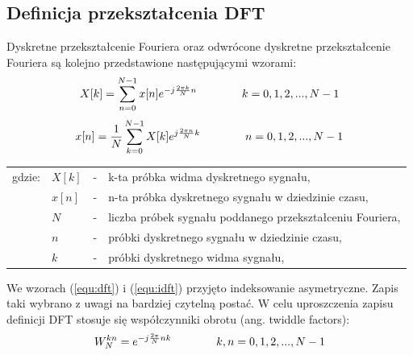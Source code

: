 \subsection{Definicja przekształcenia DFT}
Dyskretne przekształcenie Fouriera oraz odwrócone dyskretne przekształcenie Fouriera są kolejno przedstawione następującymi wzorami:
\begin{equation} \label{equ:dft}
\openup\jot
\begin{aligned}[t]
X[k] = \sum_{n=0}^{N-1} x[n]e^{-j\frac{2\pi k}{N}n} \\ 
\end{aligned}
\qquad\qquad %
\begin{aligned}[t]
k = 0, 1, 2, ..., N - 1 \\
\end{aligned}
\end{equation}
\begin{equation} \label{equ:idft}
\openup\jot
\begin{aligned}[t]
x[n] = \frac{1}{N}\sum_{k=0}^{N-1} X[k]e^{j\frac{2\pi n}{N}k}  \\  
\end{aligned}
\qquad\qquad %
\begin{aligned}[t]
 n = 0, 1, 2, ..., N - 1 \\
 \end{aligned}
\end{equation}
\begin{tabular}{ l l l l}
	gdzie: & $X[k]$ &  - & k-ta próbka widma dyskretnego sygnału, \\
	&	$x[n]$ & - &  n-ta próbka dyskretnego sygnału w dziedzinie czasu, \\
	&	$N$ & - &  liczba próbek sygnału poddanego przekształceniu Fouriera,\\
	&	$n$ & - &  próbki dyskretnego sygnału w dziedzinie czasu, \\
	&	$k$ & - &  próbki dyskretnego widma sygnału, \\
\end{tabular}

We wzorach (\ref{equ:dft}) i (\ref{equ:idft}) przyjęto indeksowanie asymetryczne. Zapis taki wybrano z uwagi na bardziej czytelną postać. W celu uproszczenia zapisu definicji DFT stosuje się współczynniki obrotu (ang. twiddle factors):
\begin{equation} \label{equ:twid_fact}
\openup\jot
\begin{aligned}[t]
	W_{N}^{kn} = e^{-j\frac{2\pi}{N}nk}  \\
\end{aligned}
\qquad\qquad %
\begin{aligned}[t]
   k, n = 0, 1, 2, ..., N - 1 \\
\end{aligned}
\end{equation}

